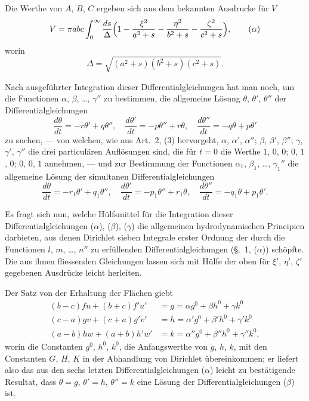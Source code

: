 \documentclass[12pt,a4paper]{article}
\begin{document}
Die Werthe von $A$, $B$, $C$ ergeben sich aus dem bekannten Ausdrucke f\"ur $V$
\begin{equation*}
V = \pi abc\int_{0}^{\infty}\frac{ds}{\Delta}\Bigl(1 - \frac{\xi^{2}}{a^{2} + s} - \frac{\eta^{2}}{b^{2} + s} - \frac{\zeta^{2}}{c^{2} + s}\Bigr),\tag{$\alpha$}
\end{equation*}
worin
\[
\Delta = \sqrt{(a^{2} + s)(b^{2} + s)(c^{2} + s)}.
\]

Nach ausgef\"uhrter Integration dieser Differentialgleichungen hat man noch, um die Functionen $\alpha$, $\beta$, \dots, $\gamma''$ zu bestimmen, die allgemeine L\"osung $\theta$, $\theta'$, $\theta''$ der Differentialgleichungen
\[
\frac{d\theta}{dt} = -r\theta' + q\theta'',\quad \frac{d\theta'}{dt} = -p\theta'' + r\theta,\quad \frac{d\theta''}{dt} = -q\theta + p\theta'\tag{$\beta$}
\]
zu suchen, --- von welchen, wie aus Art.~2, (3) hervorgeht, $\alpha$, $\alpha'$, $\alpha''$; $\beta$, $\beta'$, $\beta''$; $\gamma$, $\gamma'$, $\gamma''$ die drei particul\"aren Aufl\"osungen sind, die f\"ur $t = 0$ die Werthe $1$, $0$, $0$; $0$, $1$, $0$; $0$, $0$, $1$ annehmen, --- und zur Bestimmung der Functionen $\alpha_{1}$, $\beta_{1}$, \dots, $\gamma_{1}''$ die allgemeine L\"osung der simultanen Differentialgleichungen
\[
\frac{d\theta}{dt} = -r_{1}\theta' + q_{1}\theta'',\quad \frac{d\theta'}{dt} = -p_{1}\theta'' + r_{1}\theta,\quad \frac{d\theta''}{dt} = -q_{1}\theta + p_{1}\theta'.\tag{$\gamma$}
\]

Es fragt sich nun, welche H\"ulfsmittel f\"ur die Integration dieser Differentialgleichungen ($\alpha$), ($\beta$), ($\gamma$) die allgemeinen hydrodynamischen Principien darbieten, aus denen Dirichlet sieben Integrale erster Ordnung der durch die Functionen $l$, $m$, \dots, $n''$ zu erf\"ullenden Differentialgleichungen (\S.~1, ($\alpha$)) sch\"opfte. Die aus ihnen fliessenden Gleichungen lassen sich mit H\"ulfe der oben f\"ur $\xi'$, $\eta'$, $\zeta'$ gegebenen Ausdr\"ucke leicht herleiten.

Der Satz von der Erhaltung der Fl\"achen giebt
\begin{align*}
(b - c)fu + (b + c)f'u' &= g = \alpha g^{0} + \beta h^{0} + \gamma k^{0}\\
(c - a)gv + (c + a)g'v' &= h = \alpha' g^{0} + \beta' h^{0} + \gamma' k^{0}\\
(a - b)hw + (a + b)h'w' &= k = \alpha'' g^{0} + \beta'' h^{0} + \gamma'' k^{0},\tag{1}
\end{align*}
worin die Constanten $g^{0}$, $h^{0}$, $k^{0}$, die Anfangswerthe von $g$, $h$, $k$, mit den Constanten $G$, $H$, $K$ in der Abhandlung von Dirichlet \"ubereinkommen; er liefert also das aus den sechs letzten Differentialgleichungen ($\alpha$) leicht zu best\"atigende Resultat, dass $\theta = g$, $\theta' = h$, $\theta'' = k$ eine L\"osung der Differentialgleichungen ($\beta$) ist.
\end{document}
